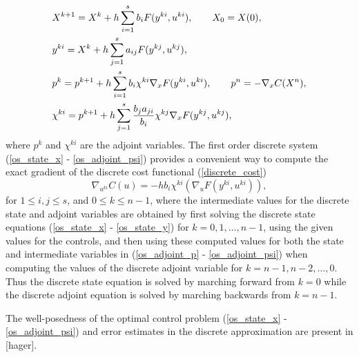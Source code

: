 \documentclass[a4paper,10pt, english]{article}
\newcommand{\D}{\displaystyle}
\begin{document}
  \begin{align}
   \D
    & X^{k+1}  = X^k + h\sum_{i=1}^{s}b_iF(y^{ki}, u^{ki}), \qquad X_0 = X(0),   \label{os_state_x}\\
 	& y^{ki} = X^k + h\sum_{j=1}^{s}a_{ij}F(y^{kj}, u^{kj}),   \label{os_state_y}\\
 	& p^k = p^{k+1} + h\sum_{i=1}^{s}b_i \chi^{ki}\nabla_x F(y^{ki}, u^{ki}), \qquad p^n = - \nabla_xC(X^n),  \label{os_adjoint_p}\\
 	& \chi^{ki} = p^{k+1} + h\sum_{j=1}^{s} \frac{b_j a_{ji}}{b_i}\chi^{kj}\nabla_x F(y^{kj}, u^{kj}), \label{os_adjoint_psi} 
   \end{align}
where $p^k$ and $\chi^{ki}$ are the adjoint variables.
The first order discrete system (\ref{os_state_x} - \ref{os_adjoint_psi}) provides a convenient way to compute the exact gradient of the discrete cost functional (\ref{discrete_cost})
\begin{equation}
\nabla_{u^{ki}} C(u) = -h b_i \chi^{ki} (\nabla_u F(y^{ki}, u^{ki})), 
\label{discretegradient}
 \end{equation}  
 for $1\leq i, j\leq s$, and $0\leq k\leq n-1$, where the intermediate values for the discrete state and adjoint variables are obtained by first
 solving the discrete state equations (\ref{os_state_x} - \ref{os_state_y}) for $k=0, 1, \dots, n-1$, using the given values for the controls, and then using these computed values for both the state and intermediate variables in (\ref{os_adjoint_p} - \ref{os_adjoint_psi}) when computing the values of the discrete adjoint variable for $k=n-1, n-2, \dots, 0$. Thus the discrete state equation is solved by marching forward from 
 $ k = 0$ while the discrete adjoint equation is solved by marching backwards from $k = n-1$.
 
 The well-posedness of the optimal control problem (\ref{os_state_x} - \ref{os_adjoint_psi}) and error estimates in the discrete approximation are present in [hager].
 
\end{document}
